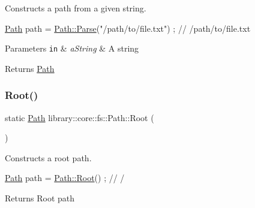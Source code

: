 Constructs a path from a given string. 


\begin{DoxyCode}
\hyperlink{classlibrary_1_1core_1_1fs_1_1_path_aaba9a8e0153813f08f78f1c3275734a4}{Path} path = \hyperlink{classlibrary_1_1core_1_1fs_1_1_path_aebf5bd3af83e0b7376616e146f3e55df}{Path::Parse}(\textcolor{stringliteral}{"/path/to/file.txt"}) ; \textcolor{comment}{// /path/to/file.txt}
\end{DoxyCode}



\begin{DoxyParams}[1]{Parameters}
\mbox{\tt in}  & {\em a\+String} & A string \\
\hline
\end{DoxyParams}
\begin{DoxyReturn}{Returns}
\hyperlink{classlibrary_1_1core_1_1fs_1_1_path}{Path} 
\end{DoxyReturn}
\mbox{\label{classlibrary_1_1core_1_1fs_1_1_path_aa7276f3f578b7ebc40bb0fba7e9c2750}} 
\subsubsection{\texorpdfstring{Root()}{Root()}}
{\footnotesize\ttfamily static \hyperlink{classlibrary_1_1core_1_1fs_1_1_path}{Path} library\+::core\+::fs\+::\+Path\+::\+Root (\begin{DoxyParamCaption}{ }\end{DoxyParamCaption})\hspace{0.3cm}{\ttfamily [static]}}



Constructs a root path. 


\begin{DoxyCode}
\hyperlink{classlibrary_1_1core_1_1fs_1_1_path_aaba9a8e0153813f08f78f1c3275734a4}{Path} path = \hyperlink{classlibrary_1_1core_1_1fs_1_1_path_aa7276f3f578b7ebc40bb0fba7e9c2750}{Path::Root}() ; \textcolor{comment}{// /}
\end{DoxyCode}


\begin{DoxyReturn}{Returns}
Root path 
\end{DoxyReturn}
\mbox{\label{classlibrary_1_1core_1_1fs_1_1_path_a8b5672cb98f78457824137454065897c}} 
